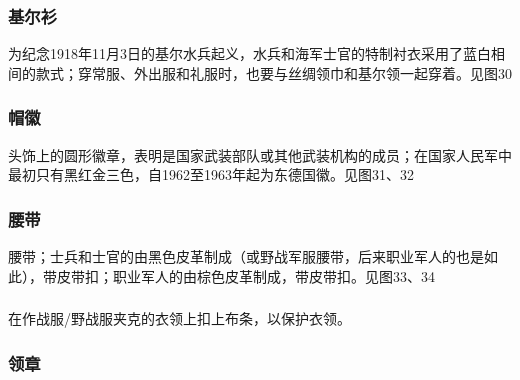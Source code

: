 \subsubsection*{基尔衫}%

为纪念1918年11月3日的基尔水兵起义，水兵和海军士官的特制衬衣采用了蓝白相间的款式；穿常服、外出服和礼服时，也要与丝绸领巾和基尔领一起穿着。见图30

\subsubsection*{帽徽}%

头饰上的圆形徽章，表明是国家武装部队或其他武装机构的成员；在国家人民军中最初只有黑红金三色，自1962至1963年起为东德国徽。见图31、32

\subsubsection*{腰带}%

腰带；士兵和士官的由黑色皮革制成（或野战军服腰带，后来职业军人的也是如此），带皮带扣；职业军人的由棕色皮革制成，带皮带扣。见图33、34

\subsubsection*{}%

在作战服/野战服夹克的衣领上扣上布条，以保护衣领。

\subsubsection*{领章}%

